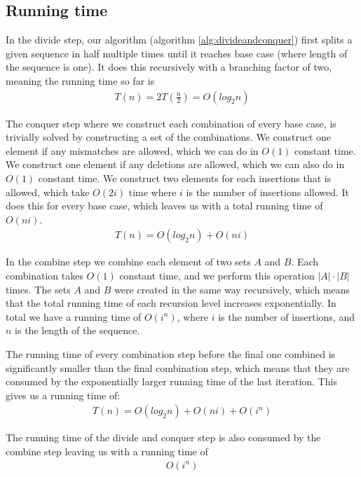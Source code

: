 \documentclass[12pt]{article}
\theoremstyle{definition}
\begin{document}
\subsection{Running time}

In the divide step, our algorithm (algorithm \ref{alg:divideandconquer}) first splits a given sequence in half multiple times until it reaches base case (where length of the sequence is one). It does this recursively with a branching factor of two, meaning the running time so far is 
\begin{eqnarray}
	T(n) = 2T(\frac{n}{2}) = O(log_2n)
\end{eqnarray}

The conquer step where we construct each combination of every base case, is trivially solved by constructing a set of the combinations. We construct one element if any mismatches are allowed, which we can do in $O(1)$ constant time. We construct one element if any deletions are allowed, which we can also do in $O(1)$ constant time. We construct two elements for each insertions that is allowed, which take $O(2i)$ time where $i$ is the number of insertions allowed. It does this for every base case, which leaves us with a total running time of $O(ni)$.
\begin{eqnarray}
	T(n) = O(log_2n) + O(ni)
\end{eqnarray}

In the combine step we combine each element of two sets $A$ and $B$. Each combination takes $O(1)$ constant time, and we perform this operation $|A| \cdot |B|$ times. The sets $A$ and $B$ were created in the same way recursively, which means that the total running time of each recursion level increases exponentially. In total we have a running time of $O(i^n)$, where $i$ is the number of insertions, and $n$ is the length of the sequence.

The running time of every combination step before the final one combined is significantly smaller than the final combination step, which means that they are consumed by the exponentially larger running time of the last iteration. This gives us a running time of:
\begin{eqnarray}
	T(n) = O(log_2n) + O(ni) + O(i^n)
\end{eqnarray}

The running time of the divide and conquer step is also consumed by the combine step leaving us with a running time of
\begin{eqnarray}
	O(i^n)
\end{eqnarray}
\end{document}
